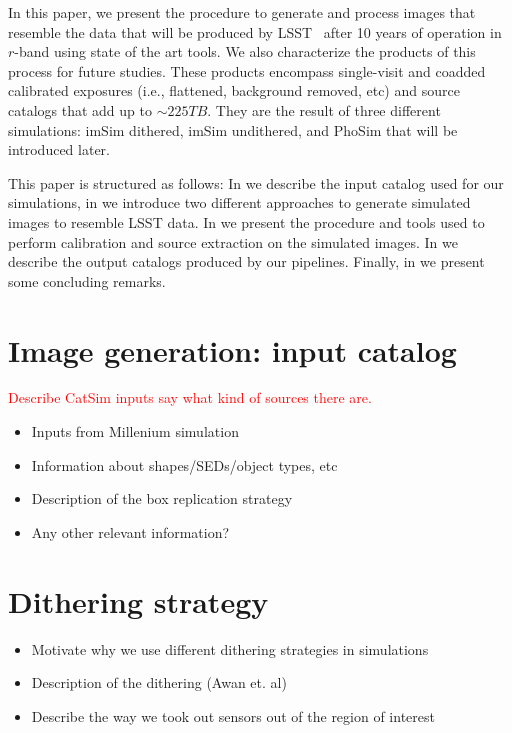 \documentclass[\docopts]{\docclass}
\begin{document}
In this paper, we present the procedure to generate and process images that resemble the data that will be produced by
LSST~\citep{2008arXiv0805.2366I} after 10 years of operation in $r$-band using state of the art tools. We also characterize
the products of this process for future studies. These products encompass single-visit and coadded calibrated exposures
(i.e., flattened, background removed, etc) and source catalogs that add up to $\sim 225 TB$. They are the result of three
different simulations: imSim dithered, imSim undithered, and PhoSim that will be introduced later.

This paper is structured as follows: In  we describe the input catalog used for our simulations,
in  we introduce two different approaches to generate simulated images to
resemble LSST data. In  we present the procedure and tools used to perform
calibration and source extraction on the simulated images. In  we describe the output catalogs
produced by our pipelines. Finally, in  we present some concluding remarks.

\section{Image generation: input catalog}
\label{sec:inputs}
\textcolor{red}{Describe CatSim inputs say what kind of sources there are.}
\begin{itemize}
  \item Inputs from Millenium simulation
  \item Information about shapes/SEDs/object types, etc
  \item Description of the box replication strategy
  \item Any other relevant information?
\end{itemize}
\section{Dithering strategy}
\label{sec:dithering}
\begin{itemize}
    \item Motivate why we use different dithering strategies in simulations
    \item Description of the dithering (Awan et. al)
    \item Describe the way we took out sensors out of the region of interest
\end{itemize}
\end{document}

